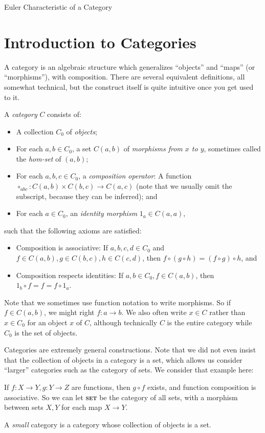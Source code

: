 \documentclass[12pt]{pom_thesis}
\newcommand{\catname}[1]{\textbf{\textsc{#1}}}
\begin{document}
\begin{chapter}{Euler Characteristic of a Category}\label{chap_euler}
\section{Introduction to Categories} \label{cat_defs}

A category is an algebraic structure which generalizes ``objects'' and ``maps'' (or ``morphisms''), with composition. There are several equivalent definitions, all somewhat technical, but the construct itself is quite intuitive once you get used to it.  
\begin{defn}
A \textit{category} $C$ consists of:
\begin{itemize}
\item A collection $C_0$ of \emph{objects};
\item For each $a,b \in C_0$, a set $C(a,b)$ of \emph{morphisms from $x$ to $y$}, sometimes called the \emph{hom-set} of $(a,b)$;
\item For each $a,b,c \in C_0$, a \emph{composition operator}: A function $\circ_{abc} :C(a,b) \times C(b,c) \rightarrow C(a,c)$ (note that we usually omit the subscript, because they can be inferred); and
\item For each $a \in C_0$, an \emph{identity morphism} $1_a \in C(a,a)$,
\end{itemize}
such that the following axioms are satisfied:
\begin{itemize}
\item Composition is associative: If $a,b,c,d \in C_0$ and $f\in C(a,b), g \in C(b,c), h \in C(c,d)$, then $f \circ (g \circ h) = (f \circ g) \circ h$, and
\item Composition respects identities: If $a,b \in C_0, f \in C(a,b)$, then $1_b \circ f = f = f \circ 1_a$.
\end{itemize}
\end{defn}
Note that we sometimes use function notation to write morphisms. So if $f \in C(a,b)$, we might right $f:a \rightarrow b$. We also often write $x \in C$ rather than $x \in C_0$ for an object $x$ of $C$, although technically $C$ is the entire category while $C_0$ is the set of objects.

Categories are extremely general constructions. Note that we did not even insist that the collection of objects in a category is a set, which allows us consider ``larger'' categories such as the category of sets. We consider that example here:
\begin{examp}
If $f:X \rightarrow Y, g:Y\rightarrow Z$ are functions, then $g \circ f$ exists, and function composition is associative. So we can let \catname{set} be the category of all sets, with a morphism between sets $X,Y$ for each map $X \rightarrow Y$. 
\end{examp}
A \emph{small} category is a category whose collection of objects is a set.


\end{chapter}
\end{document}
